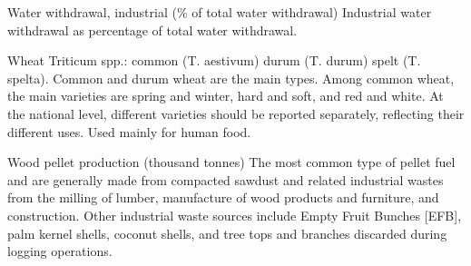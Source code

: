 \begin{MetadataCollection} {}
\begin{metadata}{Water withdrawal, industrial (\% of total water withdrawal)} {}
Industrial water withdrawal as percentage of total water withdrawal.
\end{metadata}

\begin{metadata}{Wheat} {}
Triticum spp.: common (T. aestivum) durum (T. durum) spelt (T. spelta). Common and durum wheat are the main types. Among common wheat, the main varieties are spring and winter, hard and soft, and red and white. At the national level, different varieties should be reported separately, reflecting their different uses. Used mainly for human food.
\end{metadata}

\begin{metadata}{Wood pellet production (thousand tonnes)} {}
The most common type of pellet fuel and are generally made from compacted sawdust and related industrial wastes from the milling of lumber, manufacture of wood products and furniture, and construction. Other industrial waste sources include Empty Fruit Bunches [EFB], palm kernel shells, coconut shells, and tree tops and branches discarded during logging operations.
\end{metadata}

\onecolumn

{}

\clearpage

\end{MetadataCollection}
